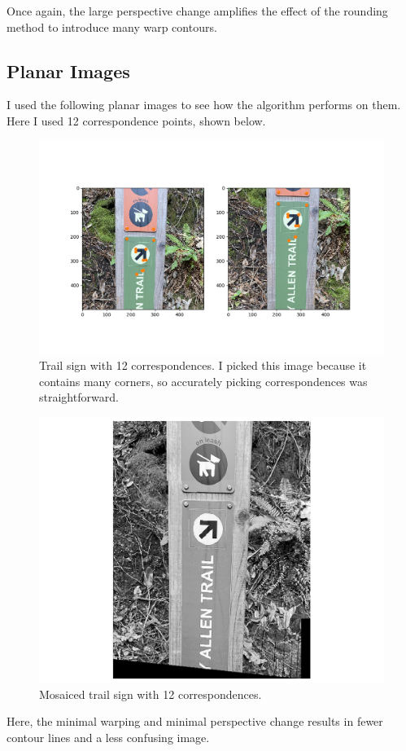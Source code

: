 \documentclass[]{article}
\begin{document}
	Once again, the large perspective change amplifies the effect of the rounding method to introduce many warp contours. 

\newpage

	\subsection{Planar Images}
		I used the following planar images to see how the algorithm performs on them. Here I used 12 correspondence points, shown below.
		
		\begin{figure}[H]
			\centering
			\includegraphics[width=6.5in]{test_images/sign_12_correspondences.png}
			\caption{Trail sign with 12 correspondences. I picked this image because it contains many corners, so accurately picking correspondences was straightforward.}
		\end{figure}
	
		\begin{figure}[H]
			\centering
			\includegraphics[width=6.5in]{test_images/sign_12_floor.png}
			\caption{Mosaiced trail sign with 12 correspondences. }
		\end{figure}
	Here, the minimal warping and minimal perspective change results in fewer contour lines and a less confusing image. 
\end{document}
